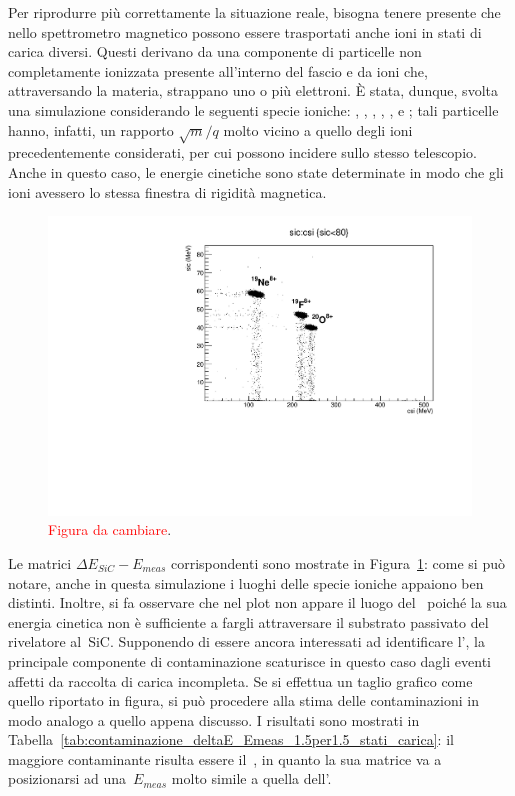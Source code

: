 Per riprodurre più correttamente la situazione reale, bisogna tenere presente che nello spettrometro magnetico possono essere trasportati anche ioni in stati di carica diversi. 
Questi derivano da una componente di particelle non completamente ionizzata presente all'interno del fascio e da ioni che, attraversando la materia, strappano uno o più elettroni.
È stata, dunque, svolta una simulazione considerando le seguenti specie ioniche: , , , , ,  e ; tali particelle hanno, infatti, un rapporto $\sqrt{m}/q$ molto vicino a quello degli ioni precedentemente considerati, per cui possono incidere sullo stesso telescopio.
Anche in questo caso, le energie cinetiche sono state determinate in modo che gli ioni avessero lo stessa finestra di rigidità magnetica.
\begin{figure} [!p]
	\centering
	\includegraphics[width=\textwidth, keepaspectratio]{Grafici_Tesi2/PID/20O8+_19F8+_19Ne8+.pdf}
	\caption{\textcolor{red}{Figura da cambiare}.} \label{fig:deltaE_Emeas_PID_stati_carica}
\end{figure} 
Le matrici $\Delta E_{SiC} - E_{meas}$ corrispondenti sono mostrate in Figura~\ref{fig:deltaE_Emeas_PID_stati_carica}: come si può notare, anche in questa simulazione i luoghi delle specie ioniche appaiono ben distinti.
Inoltre, si fa osservare che nel plot non appare il luogo del~ poiché la sua energia cinetica non è sufficiente a fargli attraversare il substrato passivato del rivelatore al~SiC.
Supponendo di essere ancora interessati ad identificare l', la principale componente di contaminazione scaturisce in questo caso dagli eventi affetti da raccolta di carica incompleta.
Se si effettua un taglio grafico come quello riportato in figura, si può procedere alla stima delle contaminazioni in modo analogo a quello appena discusso.
I risultati sono mostrati in Tabella~\ref{tab:contaminazione_deltaE_Emeas_1.5per1.5_stati_carica}: il maggiore contaminante risulta essere il~, in quanto la sua matrice va a posizionarsi ad una~$E_{meas}$ molto simile a quella dell'.

